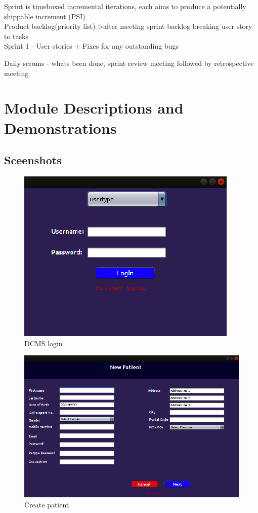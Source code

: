 \documentclass[11 pt]{article}
\begin{document}
Sprint is timeboxed incremental iterations, each aims to produce a potentially shippable increment (PSI).\\
Product backlog(priority list)->after meeting sprint backlog breaking user story to tasks \\
Sprint 1 - User stories + Fixes for any outstanding bugs

Daily scrums - whats been done, sprint review meeting
followed by retrospective meeting
\newpage
\section{Module Descriptions and Demonstrations} 
\subsection{Sceenshots}
\begin{figure}[h]
    \centering 
    \includegraphics[width=0.7\linewidth]{login.png}
    \caption{DCMS login}
    \label{fig:login}
    \end{figure}
    
    \begin{figure}[h]
    \centering 
    \includegraphics[width=\linewidth]{UI_create_ patient.png}
    \caption{Create patient}
    \label{fig:create_patient}
    \end{figure}
    
\end{document}

